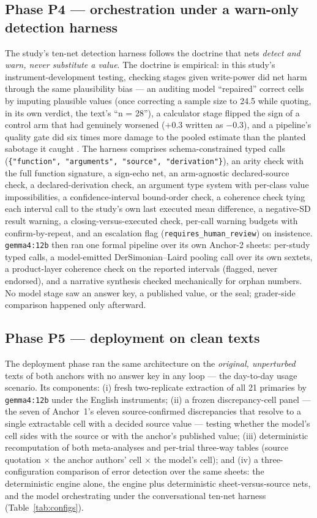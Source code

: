 \documentclass[11pt]{article}
\begin{document}
\subsection{Phase P4 --- orchestration under a warn-only detection harness}
The study's ten-net detection harness follows the doctrine that nets \emph{detect and warn, never substitute a value}. The doctrine is empirical: in this study's instrument-development testing, checking stages given write-power did net harm through the same plausibility bias --- an auditing model ``repaired'' correct cells by imputing plausible values (once correcting a sample size to 24.5 while quoting, in its own verdict, the text's ``n = 28''), a calculator stage flipped the sign of a control arm that had genuinely worsened ($+0.3$ written as $-0.3$), and a pipeline's quality gate did six times more damage to the pooled estimate than the planted sabotage it caught \citep{barra2026extrai}. The harness comprises schema-constrained typed calls (\texttt{\{"function", "arguments", "source", "derivation"\}}), an arity check with the full function signature, a sign-echo net, an arm-agnostic declared-source check, a declared-derivation check, an argument type system with per-class value impossibilities, a confidence-interval bound-order check, a coherence check tying each interval call to the study's own last executed mean difference, a negative-SD result warning, a closing-versus-executed check, per-call warning budgets with confirm-by-repeat, and an escalation flag (\texttt{requires\_human\_review}) on insistence. \texttt{gemma4:12b} then ran one formal pipeline over its own Anchor-2 sheets: per-study typed calls, a model-emitted DerSimonian--Laird pooling call over its own sextets, a product-layer coherence check on the reported intervals (flagged, never endorsed), and a narrative synthesis checked mechanically for orphan numbers. No model stage saw an answer key, a published value, or the seal; grader-side comparison happened only afterward.

\subsection{Phase P5 --- deployment on clean texts}\label{sec:p5}
The deployment phase ran the same architecture on the \emph{original, unperturbed} texts of both anchors with no answer key in any loop --- the day-to-day usage scenario. Its components: (i) fresh two-replicate extraction of all 21 primaries by \texttt{gemma4:12b} under the English instruments; (ii) a frozen discrepancy-cell panel --- the seven of Anchor~1's eleven source-confirmed discrepancies that resolve to a single extractable cell with a decided source value --- testing whether the model's cell sides with the source or with the anchor's published value; (iii) deterministic recomputation of both meta-analyses and per-trial three-way tables (source quotation $\times$ the anchor authors' cell $\times$ the model's cell); and (iv) a three-configuration comparison of error detection over the same sheets: the deterministic engine alone, the engine plus deterministic sheet-versus-source nets, and the model orchestrating under the conversational ten-net harness (Table~\ref{tab:configs}).
\end{document}
